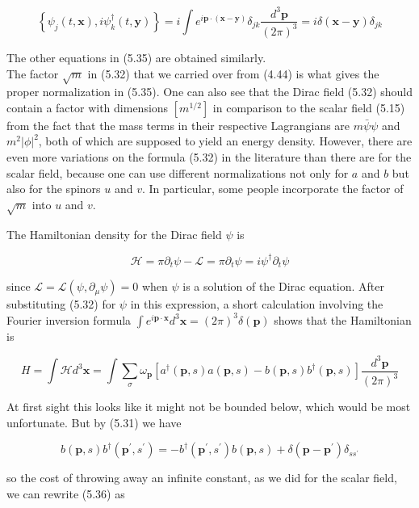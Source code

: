 \documentclass[10pt, letterpaper]{article}
\begin{document}
$$
\left\{\psi_{j}(t, \mathbf{x}), i \psi_{k}^{\dagger}(t, \mathbf{y})\right\}=i \int e^{i \mathbf{p} \cdot(\mathbf{x}-\mathbf{y})} \delta_{j k} \frac{d^{3} \mathbf{p}}{(2 \pi)^{3}}=i \delta(\mathbf{x}-\mathbf{y}) \delta_{j k}
$$

The other equations in (5.35) are obtained similarly.\\
The factor $\sqrt{m}$ in (5.32) that we carried over from (4.44) is what gives the proper normalization in (5.35). One can also see that the Dirac field (5.32) should contain a factor with dimensions $\left[m^{1 / 2}\right]$ in comparison to the scalar field (5.15) from the fact that the mass terms in their respective Lagrangians are $m \bar{\psi} \psi$ and $m^{2}|\phi|^{2}$, both of which are supposed to yield an energy density. However, there are even more variations on the formula (5.32) in the literature than there are for the scalar field, because one can use different normalizations not only for $a$ and $b$ but also for the spinors $u$ and $v$. In particular, some people incorporate the factor of $\sqrt{m}$ into $u$ and $v$.

The Hamiltonian density for the Dirac field $\psi$ is

$$
\mathcal{H}=\pi \partial_{t} \psi-\mathcal{L}=\pi \partial_{t} \psi=i \psi^{\dagger} \partial_{t} \psi
$$

since $\mathcal{L}=\mathcal{L}\left(\psi, \partial_{\mu} \psi\right)=0$ when $\psi$ is a solution of the Dirac equation. After substituting (5.32) for $\psi$ in this expression, a short calculation involving the Fourier inversion formula $\int e^{i \mathbf{p} \cdot \mathbf{x}} d^{3} \mathbf{x}=(2 \pi)^{3} \delta(\mathbf{p})$ shows that the Hamiltonian is

$$
H=\int \mathcal{H} d^{3} \mathbf{x}=\int \sum_{\sigma} \omega_{\mathbf{p}}\left[a^{\dagger}(\mathbf{p}, s) a(\mathbf{p}, s)-b(\mathbf{p}, s) b^{\dagger}(\mathbf{p}, s)\right] \frac{d^{3} \mathbf{p}}{(2 \pi)^{3}}
$$

At first sight this looks like it might not be bounded below, which would be most unfortunate. But by (5.31) we have

$$
b(\mathbf{p}, s) b^{\dagger}\left(\mathbf{p}^{\prime}, s^{\prime}\right)=-b^{\dagger}\left(\mathbf{p}^{\prime}, s^{\prime}\right) b(\mathbf{p}, s)+\delta\left(\mathbf{p}-\mathbf{p}^{\prime}\right) \delta_{s s^{\prime}}
$$

so the cost of throwing away an infinite constant, as we did for the scalar field, we can rewrite (5.36) as
\end{document}

